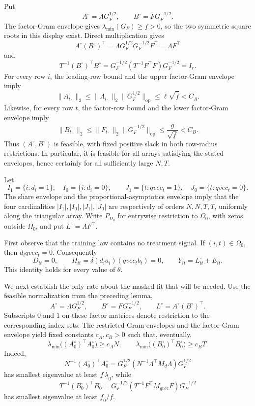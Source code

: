 Put
\[
 A^\circ=\Lambda G_F^{1/2},\qquad B^\circ=F G_F^{-1/2}.
\]
The factor-Gram envelope gives \(\lambda_{\min}(G_F)\geq\underline f>0\), so the two symmetric square roots in this display exist.  Direct multiplication gives
\[
 A^\circ(B^\circ)^{\top}
 =\Lambda G_F^{1/2}G_F^{-1/2}F^{\top}
 =\Lambda F^{\top}
\]
and
\[
 T^{-1}(B^\circ)^{\top}B^\circ
 =G_F^{-1/2}(T^{-1}F^{\top}F)G_F^{-1/2}
 =I_r.
\]
For every row \(i\), the loading-row bound and the upper factor-Gram envelope imply
\[
 \|A^\circ_{i\cdot}\|_2
 \leq \|\Lambda_{i\cdot}\|_2\|G_F^{1/2}\|_{\mathrm{op}}
 \leq \overline\ell\sqrt{\overline f}<C_A.
\]
Likewise, for every row \(t\), the factor-row bound and the lower factor-Gram envelope imply
\[
 \|B^\circ_{t\cdot}\|_2
 \leq \|F_{t\cdot}\|_2\|G_F^{-1/2}\|_{\mathrm{op}}
 \leq \frac{\overline g}{\sqrt{\underline f}}<C_B.
\]
Thus \((A^\circ,B^\circ)\) is feasible, with fixed positive slack in both row-radius restrictions.  In particular, it is feasible for all arrays satisfying the stated envelopes, hence certainly for all sufficiently large \(N,T\).

Let
\[
 I_1=\{i:d_i=1\},\quad I_0=\{i:d_i=0\},\qquad
 J_1=\{t:qvec_t=1\},\quad J_0=\{t:qvec_t=0\}.
\]
The share envelope and the proportional-asymptotics envelope imply that the four cardinalities \(|I_1|,|I_0|,|J_1|,|J_0|\) are respectively of orders \(N,N,T,T\), uniformly along the triangular array.  Write \(P_{\Omega_0}\) for entrywise restriction to \(\Omega_0\), with zeros outside \(\Omega_0\), and put \(L^\circ=\Lambda F^{\top}\).

First observe that the training law contains no treatment signal.  If \((i,t)\in\Omega_0\), then \(d_iqvec_t=0\).  Consequently
\[
 D_{it}=0,\qquad
 H_{it}=\delta(d_i a_i)(qvec_t b_t)=0,\qquad
 Y_{it}=L^\circ_{it}+E_{it}.
\tag{1}
\]
This identity holds for every value of \(\theta\).

We next establish the only rate about the masked fit that will be needed.  Use the feasible normalization from the preceding lemma,
\[
 A^\circ=\Lambda G_F^{1/2},\qquad B^\circ=F G_F^{-1/2},\qquad
 L^\circ=A^\circ(B^\circ)^{\top}.
\tag{2}
\]
Subscripts \(0\) and \(1\) on these factor matrices denote restriction to the corresponding index sets.  The restricted-Gram envelopes and the factor-Gram envelope yield fixed constants \(c_A,c_B>0\) such that, eventually,
\[
 \lambda_{\min}\bigl((A^\circ_0)^{\top}A^\circ_0\bigr)
 \geq c_A N,
 \qquad
 \lambda_{\min}\bigl((B^\circ_0)^{\top}B^\circ_0\bigr)
 \geq c_B T.
\tag{3}
\]
Indeed,
\[
 N^{-1}(A^\circ_0)^{\top}A^\circ_0
 =G_F^{1/2}(N^{-1}\Lambda^{\top}M_d\Lambda)G_F^{1/2}
\]
has smallest eigenvalue at least \(\underline f\,\underline\lambda_0\), while
\[
 T^{-1}(B^\circ_0)^{\top}B^\circ_0
 =G_F^{-1/2}(T^{-1}F^{\top}M_{qvec}F)G_F^{-1/2}
\]
has smallest eigenvalue at least \(\underline f_0/\overline f\).

